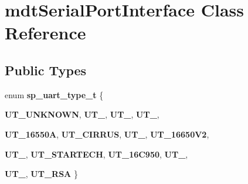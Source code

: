 \hypertarget{classmdt_serial_port_interface}{
\section{mdtSerialPortInterface Class Reference}
\label{classmdt_serial_port_interface}
}
\subsection*{Public Types}
\begin{DoxyCompactItemize}
\item 
enum {\bfseries sp\_\-uart\_\-type\_\-t} \{ \par
{\bfseries UT\_\-UNKNOWN}, 
{\bfseries UT\_}, 
{\bfseries UT\_}, 
{\bfseries UT\_}, 
\par
{\bfseries UT\_\-16550A}, 
{\bfseries UT\_\-CIRRUS}, 
{\bfseries UT\_}, 
{\bfseries UT\_\-16650V2}, 
\par
{\bfseries UT\_}, 
{\bfseries UT\_\-STARTECH}, 
{\bfseries UT\_\-16C950}, 
{\bfseries UT\_}, 
\par
{\bfseries UT\_}, 
{\bfseries UT\_\-RSA}
 \}
\end{DoxyCompactItemize}
